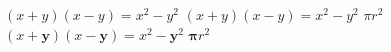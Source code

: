 \documentclass[a4paper]{article}
\begin{document}
$(x+y)(x-y)=x^{2}-y^{2}$
{\boldmath $(x+y)(x-y)=x^{2}-y^{2}$ $\pi r^2$}
$(x+\mathbf{y})(x-\mathbf{y})=x^{2}-{\mathbf{y}}^{2}$
$\mathbf{\pi} r^2$ %
\end{document}
